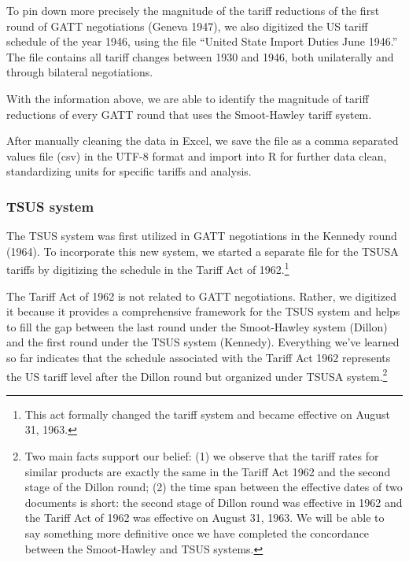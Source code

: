\documentclass[
  12pt,
]{article}
\begin{document}
To pin down more precisely the magnitude of the tariff reductions of the first round of GATT negotiations (Geneva 1947), we also digitized the US tariff schedule of the year 1946, using the file ``United State Import Duties June 1946.'' The file contains all tariff changes between 1930 and 1946, both unilaterally and through bilateral negotiations.

With the information above, we are able to identify the magnitude of tariff reductions of every GATT round that uses the Smoot-Hawley tariff system.

After manually cleaning the data in Excel, we save the file as a comma separated values file (csv) in the UTF-8 format and import into R for further data clean, standardizing units for specific tariffs and analysis.

\hypertarget{tsus-system}{%
\subsubsection{TSUS system}\label{tsus-system}}

The TSUS system was first utilized in GATT negotiations in the Kennedy round (1964). To incorporate this new system, we started a separate file for the TSUSA tariffs by digitizing the schedule in the Tariff Act of 1962.\footnote{This act formally changed the tariff system and became effective on August 31, 1963.}

The Tariff Act of 1962 is not related to GATT negotiations. Rather, we digitized it because it provides a comprehensive framework for the TSUS system and helps to fill the gap between the last round under the Smoot-Hawley system (Dillon) and the first round under the TSUS system (Kennedy). Everything we've learned so far indicates that the schedule associated with the Tariff Act 1962 represents the US tariff level after the Dillon round but organized under TSUSA system.\footnote{Two main facts support our belief: (1) we observe that the tariff rates for similar products are exactly the same in the Tariff Act 1962 and the second stage of the Dillon round; (2) the time span between the effective dates of two documents is short: the second stage of Dillon round was effective in 1962 and the Tariff Act of 1962 was effective on August 31, 1963. We will be able to say something more definitive once we have completed the concordance between the Smoot-Hawley and TSUS systems.}
\end{document}
